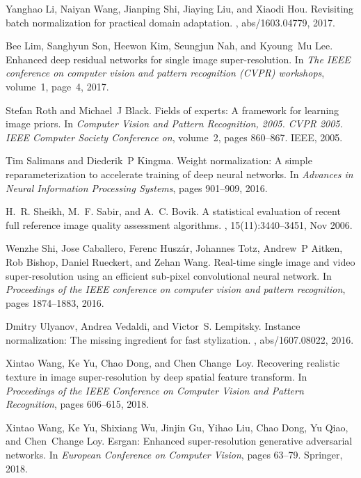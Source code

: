 \documentclass[10pt,twocolumn,letterpaper]{article}
\begin{document}
{\begin{thebibliography}{10}
	Yanghao Li, Naiyan Wang, Jianping Shi, Jiaying Liu, and Xiaodi Hou.
	\newblock Revisiting batch normalization for practical domain adaptation.
	, abs/1603.04779, 2017.
	
	Bee Lim, Sanghyun Son, Heewon Kim, Seungjun Nah, and Kyoung~Mu Lee.
	\newblock Enhanced deep residual networks for single image super-resolution.
	\newblock In {\em The IEEE conference on computer vision and pattern
		recognition (CVPR) workshops}, volume~1, page~4, 2017.
	
	Stefan Roth and Michael~J Black.
	\newblock Fields of experts: A framework for learning image priors.
	\newblock In {\em Computer Vision and Pattern Recognition, 2005. CVPR 2005.
		IEEE Computer Society Conference on}, volume~2, pages 860--867. IEEE, 2005.
	
	Tim Salimans and Diederik~P Kingma.
	\newblock Weight normalization: A simple reparameterization to accelerate
	training of deep neural networks.
	\newblock In {\em Advances in Neural Information Processing Systems}, pages
	901--909, 2016.
	
	H.~R. Sheikh, M.~F. Sabir, and A.~C. Bovik.
	\newblock A statistical evaluation of recent full reference image quality
	assessment algorithms.
	, 15(11):3440--3451, Nov
	2006.
	
	Wenzhe Shi, Jose Caballero, Ferenc Husz{\'a}r, Johannes Totz, Andrew~P Aitken,
	Rob Bishop, Daniel Rueckert, and Zehan Wang.
	\newblock Real-time single image and video super-resolution using an efficient
	sub-pixel convolutional neural network.
	\newblock In {\em Proceedings of the IEEE conference on computer vision and
		pattern recognition}, pages 1874--1883, 2016.
	
	Dmitry Ulyanov, Andrea Vedaldi, and Victor~S. Lempitsky.
	\newblock Instance normalization: The missing ingredient for fast stylization.
	, abs/1607.08022, 2016.
	
	Xintao Wang, Ke Yu, Chao Dong, and Chen Change~Loy.
	\newblock Recovering realistic texture in image super-resolution by deep
	spatial feature transform.
	\newblock In {\em Proceedings of the IEEE Conference on Computer Vision and
		Pattern Recognition}, pages 606--615, 2018.
	
	Xintao Wang, Ke Yu, Shixiang Wu, Jinjin Gu, Yihao Liu, Chao Dong, Yu Qiao, and
	Chen~Change Loy.
	\newblock Esrgan: Enhanced super-resolution generative adversarial networks.
	\newblock In {\em European Conference on Computer Vision}, pages 63--79.
	Springer, 2018.
	

\end{thebibliography}}
\end{document}
